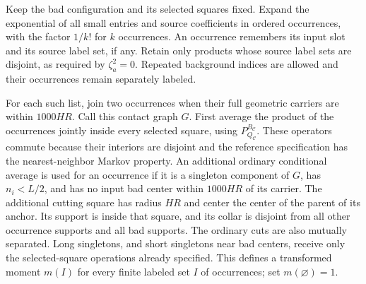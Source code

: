 Keep the bad configuration and its selected squares fixed.  Expand the
exponential of all small entries and source coefficients in ordered
occurrences, with the factor $1/k!$ for $k$ occurrences.  An occurrence
remembers its input slot and its source label set, if any.  Retain only
products whose source label sets are disjoint, as required by
$\zeta_a^2=0$.  Repeated background indices are allowed and their
occurrences remain separately labeled.

For each such list, join two occurrences when their full geometric
carriers are within $1000HR$.  Call this contact graph $G$.  First average the product of the occurrences jointly inside
every selected square, using $P_{Q_{\mathcal C}}^{B_{\mathcal C}}$.
These operators commute because their interiors are disjoint and the
reference specification has the nearest-neighbor Markov property.
An additional ordinary conditional average is used for an occurrence
if it is a singleton component of $G$, has $n_i<L/2$, and has no input
bad center within $1000HR$ of its carrier.  The additional cutting square
has radius $HR$ and center the center of the parent of its anchor.
Its support is inside that square, and its collar is disjoint from all
other occurrence supports and all bad supports.  The ordinary cuts
are also mutually separated.  Long singletons, and short singletons
near bad centers, receive only the selected-square operations already
specified.  This defines a transformed moment $m(I)$ for every finite
labeled set $I$ of occurrences; set $m(\varnothing)=1$.

